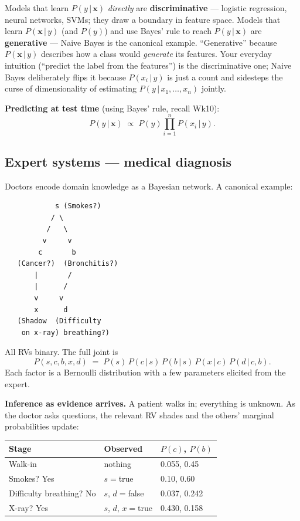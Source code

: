 \documentclass[11pt, a4paper]{article}
\newcommand{\thead}[1]{\textbf{#1}}
\begin{document}
\begin{notebox}
Models that learn $P(y\,|\,\mathbf{x})$ \emph{directly} are \textbf{discriminative} — logistic regression, neural networks, SVMs; they draw a boundary in feature space. Models that learn $P(\mathbf{x}\,|\,y)$ (and $P(y)$) and use Bayes' rule to reach $P(y\,|\,\mathbf{x})$ are \textbf{generative} — Naive Bayes is the canonical example. ``Generative'' because $P(\mathbf{x}\,|\,y)$ describes how a class would \emph{generate} its features. Your everyday intuition (``predict the label from the features'') is the discriminative one; Naive Bayes deliberately flips it because $P(x_i\,|\,y)$ is just a count and sidesteps the curse of dimensionality of estimating $P(y\,|\,x_1,\dots,x_n)$ jointly.
\end{notebox}

\textbf{Predicting at test time} (using Bayes' rule, recall Wk10):
\[
P(y\,|\,\mathbf{x}) \;\propto\; P(y) \prod_{i=1}^n P(x_i\,|\,y).
\]

\subsection{Expert systems --- medical diagnosis}

Doctors encode domain knowledge as a Bayesian network. A canonical example:

\begin{verbatim}
            s (Smokes?)
           / \
          /   \
         v     v
        c       b
   (Cancer?)  (Bronchitis?)
       |       /
       |      /
       v     v
       x      d
   (Shadow  (Difficulty
    on x-ray) breathing?)
\end{verbatim}

All RVs binary. The full joint is
\[
P(s,c,b,x,d) \;=\; P(s)\,P(c\,|\,s)\,P(b\,|\,s)\,P(x\,|\,c)\,P(d\,|\,c, b).
\]
Each factor is a Bernoulli distribution with a few parameters elicited from the expert.

\textbf{Inference as evidence arrives.} A patient walks in; everything is unknown. As the doctor asks questions, the relevant RV shades and the others' marginal probabilities update:

\begin{tabularx}{\linewidth}{@{}lXX@{}}
\toprule
\thead{Stage} & \thead{Observed} & \thead{$P(c)$, $P(b)$} \\
\midrule
Walk-in                 & nothing                          & 0.055, 0.45 \\
Smokes? Yes             & $s = $true                       & 0.10, 0.60 \\
Difficulty breathing? No & $s$, $d=$false                  & 0.037, 0.242 \\
X-ray? Yes              & $s$, $d$, $x=$true               & 0.430, 0.158 \\
\bottomrule
\end{tabularx}
\end{document}
